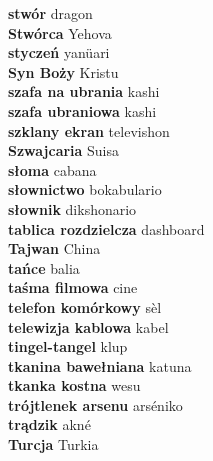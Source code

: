 \textbf{ stwór  } dragon \\
\textbf{ Stwórca  } Yehova \\
\textbf{ styczeń  } yanüari \\
\textbf{ Syn Boży  } Kristu \\
\textbf{ szafa na ubrania  } kashi \\
\textbf{ szafa ubraniowa  } kashi \\
\textbf{ szklany ekran  } televishon \\
\textbf{ Szwajcaria  } Suisa \\
\textbf{ słoma  } cabana \\
\textbf{ słownictwo  } bokabulario \\
\textbf{ słownik  } dikshonario \\
\textbf{ tablica rozdzielcza  } dashboard \\
\textbf{ Tajwan  } China \\
\textbf{ tańce  } balia \\
\textbf{ taśma filmowa  } cine \\
\textbf{ telefon komórkowy  } sèl \\
\textbf{ telewizja kablowa  } kabel \\
\textbf{ tingel-tangel  } klup \\
\textbf{ tkanina bawełniana  } katuna \\
\textbf{ tkanka kostna  } wesu \\
\textbf{ trójtlenek arsenu  } arséniko \\
\textbf{ trądzik  } akné \\
\textbf{ Turcja  } Turkia \\
